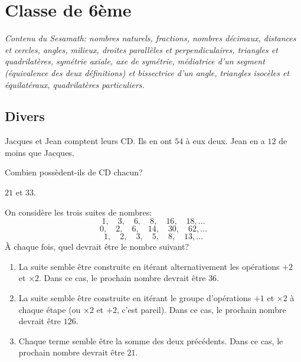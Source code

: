 \section{Classe de 6ème}

\emph{Contenu du Sesamath: nombres naturels, fractions, nombres décimaux, distances et cercles, angles, milieux, droites parallèles et perpendiculaires, triangles et quadrilatères, symétrie axiale, axe de symétrie, médiatrice d'un segment (équivalence des deux définitions) et bissectrice d'un angle, triangles isocèles et équilatéraux, quadrilatères particuliers.}



\subsection{Divers}

\begin{exo}
Jacques et Jean comptent leurs CD. Ils en ont $54$ à eux deux. Jean en a $12$ de moins que Jacques.

Combien possèdent-ils de CD chacun?
\begin{sol}
$21$ et $33$.
\end{sol}
\end{exo}

\begin{exo}
On considère les trois suites de nombres:
\[1,\quad 3,\quad 6,\quad 8,\quad 16,\quad 18, ...
\]
\[0,\quad 2,\quad 6,\quad 14,\quad 30,\quad 62, ...
\]
\[1,\quad 2,\quad 3,\quad 5,\quad 8,\quad 13, ...
\]
À chaque fois, quel devrait être le nombre suivant?
\begin{sol}
\begin{enumerate}
\item La suite semble être construite en itérant alternativement les opérations $+2$ et $\times 2$. Dans ce cas, le prochain nombre devrait être $36$.
\item La suite semble être construite en itérant le groupe d'opérations $+1$ et $\times 2$ à chaque étape (ou $\times 2$ et $+2$, c'est pareil). Dans ce cas, le prochain nombre devrait être $126$.
\item 
Chaque terme semble être la somme des deux précédents. Dans ce cas, le prochain nombre devrait être $21$.
\end{enumerate}
\end{sol}
\end{exo}


